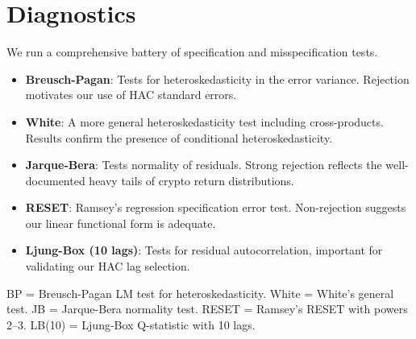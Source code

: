 \documentclass[12pt,a4paper]{article}
\begin{document}
\section{Diagnostics}

We run a comprehensive battery of specification and misspecification tests.

\begin{itemize}
\item \textbf{Breusch-Pagan}: Tests for heteroskedasticity in the error variance.
      Rejection motivates our use of HAC standard errors.
\item \textbf{White}: A more general heteroskedasticity test including
      cross-products. Results confirm the presence of conditional heteroskedasticity.
\item \textbf{Jarque-Bera}: Tests normality of residuals.
      Strong rejection reflects the well-documented heavy tails of
      crypto return distributions.
\item \textbf{RESET}: Ramsey's regression specification error test.
      Non-rejection suggests our linear functional form is adequate.
\item \textbf{Ljung-Box (10 lags)}: Tests for residual autocorrelation,
      important for validating our HAC lag selection.
\end{itemize}

\begin{table}[H]
\centering
\caption{Diagnostic Tests}
\label{tab:btc_diagnostics}
\begin{threeparttable}
\begin{tablenotes}
\footnotesize
\item BP = Breusch-Pagan LM test for heteroskedasticity. White = White's general test.
      JB = Jarque-Bera normality test. RESET = Ramsey's RESET with powers 2--3.
      LB(10) = Ljung-Box Q-statistic with 10 lags.
\end{tablenotes}
\end{threeparttable}
\end{table}
\end{document}

